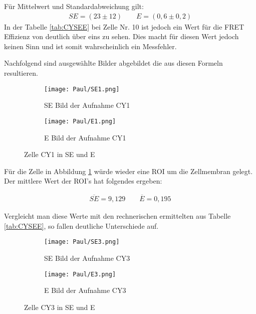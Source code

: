 Für Mittelwert und Standardabweichung gilt: 
\begin{align*}
    SE = (23 \pm 12) \qquad E = (0,6 \pm 0,2)
\end{align*}
In der Tabelle \ref{tab:CYSEE} bei Zelle Nr. 10 ist jedoch ein Wert für die FRET Effizienz von deutlich über eins zu sehen. Dies macht für diesen Wert jedoch keinen Sinn und ist somit wahrscheinlich ein Messfehler.

\newpage
Nachfolgend sind ausgewählte Bilder abgebildet die aus diesen Formeln resultieren.

\begin{figure}[h]
    \centering
    \begin{subfigure}[]{0.45\textwidth}
        \centering
        \texttt{[image: Paul/SE1.png]}
        \caption{SE Bild der Aufnahme CY1}
    \end{subfigure}
    \hfill 
    \begin{subfigure}[]{0.45\textwidth}
        \centering
        \texttt{[image: Paul/E1.png]}
        \caption{E Bild der Aufnahme CY1}
    \end{subfigure}
    \caption{Zelle CY1 in SE und E}
    \label{fig:CY1}
\end{figure}

Für die Zelle in Abbildung \ref{fig:CY1} würde wieder eine ROI um die Zellmembran gelegt. Der mittlere Wert der ROI's hat folgendes ergeben: 

\begin{align*}
    \overline{SE} = 9,129 \qquad \overline{E} = 0,195
\end{align*}

Vergleicht man diese Werte mit den rechnerischen ermittelten aus Tabelle \ref{tab:CYSEE}, so fallen deutliche Unterschiede auf.

\newpage
\begin{figure}[h]
    \centering
    \begin{subfigure}[]{0.45\textwidth}
        \centering
        \texttt{[image: Paul/SE3.png]}
        \caption{SE Bild der Aufnahme CY3}
    \end{subfigure}
    \hfill 
    \begin{subfigure}[]{0.45\textwidth}
        \centering
        \texttt{[image: Paul/E3.png]}
        \caption{E Bild der Aufnahme CY3}
    \end{subfigure}
    \caption{Zelle CY3 in SE und E}
    \label{fig:CY3}
\end{figure}

